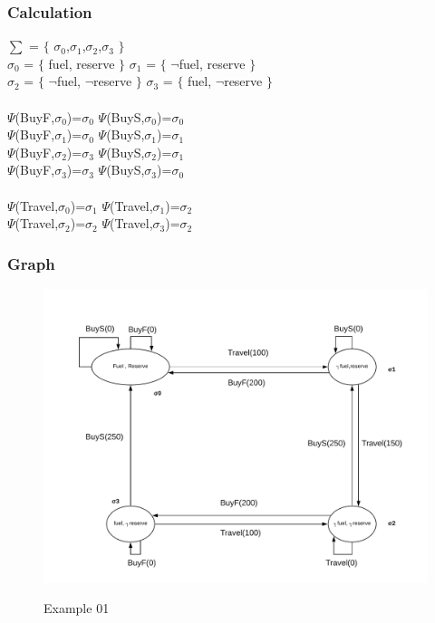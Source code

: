\documentclass[11pt]{article}
\begin{document}
\subsubsection{Calculation}\label{par:p301}\par
$\sum$ = $\lbrace$ $\sigma_{0}$,$\sigma_{1}$,$\sigma_{2}$,$\sigma_{3}$ $\rbrace$\\
$\sigma_{0}$ = $\lbrace$ fuel, reserve $\rbrace$ \indent $\sigma_{1}$ = $\lbrace$ $\neg$fuel, reserve $\rbrace$\\
$\sigma_{2}$ = $\lbrace$ $\neg$fuel, $\neg$reserve $\rbrace$ \indent $\sigma_{3}$ = $\lbrace$ fuel, $\neg$reserve $\rbrace$\\
\\
$\Psi$(BuyF,$\sigma_{0}$)=$\sigma_{0}$ \indent $\Psi$(BuyS,$\sigma_{0}$)=$\sigma_{0}$\\
$\Psi$(BuyF,$\sigma_{1}$)=$\sigma_{0}$ \indent $\Psi$(BuyS,$\sigma_{1}$)=$\sigma_{1}$\\
$\Psi$(BuyF,$\sigma_{2}$)=$\sigma_{3}$ \indent $\Psi$(BuyS,$\sigma_{2}$)=$\sigma_{1}$\\
$\Psi$(BuyF,$\sigma_{3}$)=$\sigma_{3}$ \indent $\Psi$(BuyS,$\sigma_{3}$)=$\sigma_{0}$\\
\\
$\Psi$(Travel,$\sigma_{0}$)=$\sigma_{1}$\indent
$\Psi$(Travel,$\sigma_{1}$)=$\sigma_{2}$\\
$\Psi$(Travel,$\sigma_{2}$)=$\sigma_{2}$\indent
$\Psi$(Travel,$\sigma_{3}$)=$\sigma_{2}$\\
\subsubsection{Graph}\label{par:p401}
	\begin{figure}[H]
		\includegraphics[width=1\linewidth, height=0.3\textheight]{./media/ex01.png}
		\label{Figure:f01}
		\caption{Example 01}
	\end{figure}
\end{document}
